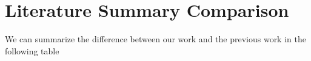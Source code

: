 




\section{Literature Summary Comparison}

We can summarize the difference between our work and the previous work in the following table

